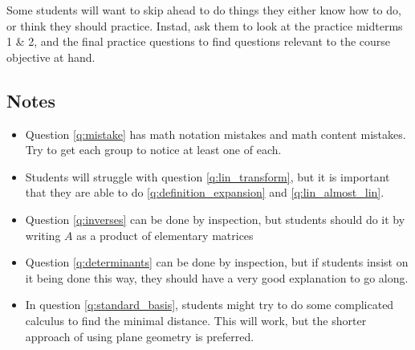 \documentclass[red]{tutorial}
\theoremstyle{definition}
\theoremstyle{theorem}
\begin{document}
{\begin{instructions}
  Some students will want to skip ahead to do things they either know how to
  do, or think they should practice. Instad, ask them to look at the 
  practice midterms 1 \& 2, and the final practice questions to find 
  questions relevant to the course objective at hand.
  \subsection*{Notes}
  \begin{itemize}
    \item
      Question \ref{q:mistake} has math notation mistakes and math content
      mistakes. Try to get each group to notice at least one of each.
    \item
      Students will struggle with question \ref{q:lin_transform}, but it is
      important that they are able to do \ref{q:definition_expansion} and
      \ref{q:lin_almost_lin}.
    \item
      Question \ref{q:inverses} can be done by inspection, but students should
      do it by writing $A$ as a product of elementary matrices
    \item
      Question \ref{q:determinants} can be done by inspection, but if students
      insist on it being done this way, they should have a very good
      explanation to go along.
    \item
      In question \ref{q:standard_basis}, students might try to do some
      complicated calculus to find the minimal distance. This will work, but
      the shorter approach of using plane geometry is preferred.
  \end{itemize}
\end{instructions}
}
\end{document}
